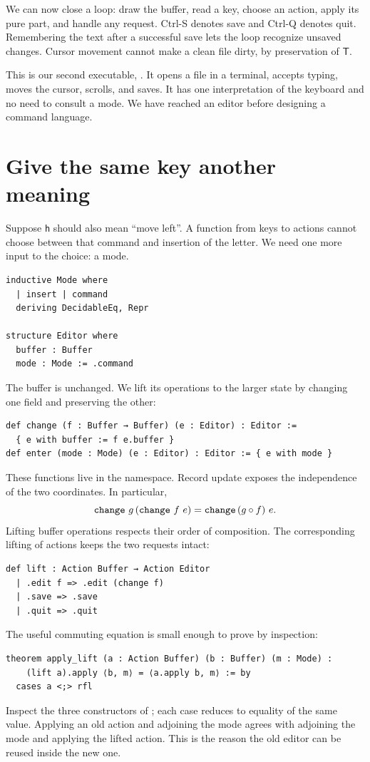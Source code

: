 \documentclass[11pt]{article}
\newcommand{\code}[1]{\texttt{\detokenize{#1}}}
\newcommand{\txt}{\mathsf{T}}
\begin{document}
We can now close a loop: draw the buffer, read a key, choose an action, apply
its pure part, and handle any request. Ctrl-S denotes save and Ctrl-Q denotes
quit. Remembering the text after a successful save lets the loop recognize
unsaved changes. Cursor movement cannot make a clean file dirty, by preservation
of $\txt$.

This is our second executable, \code{walk-editor}. It opens a file in a terminal,
accepts typing, moves the cursor, scrolls, and saves. It has one interpretation
of the keyboard and no need to consult a mode. We have reached an editor before
designing a command language.

\section{Give the same key another meaning}
\label{sec:modes}

Suppose \texttt{h} should also mean ``move left''. A function from keys to actions
cannot choose between that command and insertion of the letter. We need one
more input to the choice: a mode.
\begin{lstlisting}[language=Lean]
inductive Mode where
  | insert | command
  deriving DecidableEq, Repr

structure Editor where
  buffer : Buffer
  mode : Mode := .command
\end{lstlisting}
The buffer is unchanged. We lift its operations to the larger state by changing
one field and preserving the other:
\begin{lstlisting}[language=Lean]
def change (f : Buffer → Buffer) (e : Editor) : Editor :=
  { e with buffer := f e.buffer }
def enter (mode : Mode) (e : Editor) : Editor := { e with mode }
\end{lstlisting}
These functions live in the \code{Editor} namespace. Record update exposes the
independence of the two coordinates. In particular,
\[
 \code{change}\ g\,(\code{change}\ f\ e)
   =\code{change}\,(g\circ f)\ e.
\]
Lifting buffer operations respects their order of composition. The corresponding
lifting of actions keeps the two requests intact:
\begin{lstlisting}[language=Lean]
def lift : Action Buffer → Action Editor
  | .edit f => .edit (change f)
  | .save => .save
  | .quit => .quit
\end{lstlisting}
The useful commuting equation is small enough to prove by inspection:
\begin{lstlisting}[language=Lean]
theorem apply_lift (a : Action Buffer) (b : Buffer) (m : Mode) :
    (lift a).apply ⟨b, m⟩ = ⟨a.apply b, m⟩ := by
  cases a <;> rfl
\end{lstlisting}
Inspect the three constructors of \code{a}; each case reduces to equality of the
same value. Applying an old action and adjoining the mode agrees with adjoining
the mode and applying the lifted action. This is the reason the old editor can
be reused inside the new one.
\end{document}

